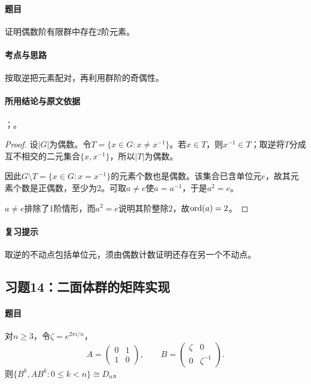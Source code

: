 \paragraph{题目}
证明偶数阶有限群中存在2阶元素。

\paragraph{考点与思路}
按取逆把元素配对，再利用群阶的奇偶性。

\paragraph{所用结论与原文依据}
；。


\begin{proof}
设$|G|$为偶数。令$T=\{x\in G:x\ne x^{-1}\}$。若$x\in T$，则$x^{-1}\in T$；取逆将$T$分成互不相交的二元集合$\{x,x^{-1}\}$，所以$|T|$为偶数。

因此$G\setminus T=\{x\in G:x=x^{-1}\}$的元素个数也是偶数。该集合已含单位元$e$，故其元素个数是正偶数，至少为2。可取$a\ne e$使$a=a^{-1}$，于是$a^2=e$。

$a\ne e$排除了1阶情形，而$a^2=e$说明其阶整除2，故$\operatorname{ord}(a)=2$。
\end{proof}

\paragraph{复习提示}
取逆的不动点包括单位元，须由偶数计数证明还存在另一个不动点。


\subsection{习题14：\texorpdfstring{二面体群的矩阵实现}{二面体群的矩阵实现}}
\label{ex:1:14}

\paragraph{题目}
对$n\geq3$，令$\zeta=e^{2\pi i/n}$，
\[
A=\begin{pmatrix}0&1\\1&0\end{pmatrix},\qquad B=\begin{pmatrix}\zeta&0\\0&\zeta^{-1}\end{pmatrix}.
\]
则$\{B^k,AB^k:0\leq k<n\}\cong D_n$。

